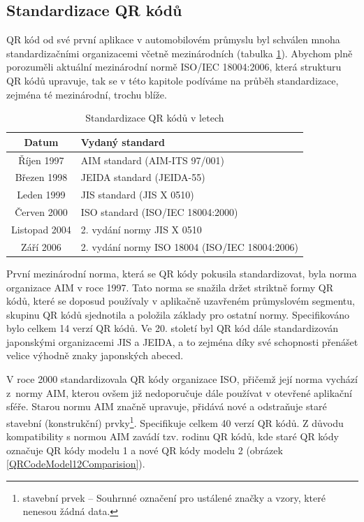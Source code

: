 \subsection{Standardizace QR kódů}
\label{standardizaceQRKodu}

QR kód od své první aplikace v automobilovém průmyslu byl schválen mnoha
standardizačními organizacemi včetně mezinárodních (tabulka 
\ref{standardizaceBehemLet}). Abychom plně porozuměli aktuální mezinárodní normě
ISO/IEC 18004:2006, která strukturu QR kódů upravuje, tak se v této 
kapitole podíváme na průběh standardizace, zejména té mezinárodní, trochu blíže.

\begin{table}[H]
  \begin{center} 
    \begin{tabular}{| c | l |} \hline
    \textbf{Datum} & \textbf{Vydaný standard} \\ \hline
    Říjen 1997 & AIM standard (AIM-ITS 97/001) \\ \hline
    Březen 1998 & JEIDA standard (JEIDA-55) \\ \hline
    Leden 1999 & JIS standard (JIS X 0510)  \\ \hline
    Červen 2000 & ISO standard (ISO/IEC 18004:2000) \\ \hline
    Listopad 2004 & 2. vydání normy JIS X 0510 \\ \hline
    Září 2006 & 2. vydání normy ISO 18004 (ISO/IEC 18004:2006)  \\ \hline
    \end{tabular}
    \caption{Standardizace QR kódů v letech \cite{standardizaceDenso}}
    \label{standardizaceBehemLet}
  \end{center}
\end{table}

První mezinárodní norma, která se QR kódy pokusila standardizovat, byla norma 
organizace AIM v roce 1997. Tato norma se snažila držet striktně formy QR kódů, 
které se doposud používaly v aplikačně uzavřeném průmyslovém segmentu, skupinu 
QR kódů sjednotila a položila základy pro ostatní normy. Specifikováno bylo 
celkem 14 verzí QR kódů. Ve 20. století byl QR kód dále standardizován 
japonskými organizacemi JIS a JEIDA, a to zejména díky své schopnosti přenášet 
velice výhodně znaky japonských abeced.

V roce 2000 standardizovala QR kódy organizace ISO, přičemž její norma vychází 
z~normy AIM, kterou ovšem již nedoporučuje dále používat v otevřené 
aplikační sféře. Starou normu AIM značně upravuje, přidává nové a 
odstraňuje staré stavební (konstrukční) prvky\footnote{stavební prvek -- Souhrnné označení pro
ustálené značky a vzory, které nenesou žádná data.}.
Specifikuje celkem 40 verzí QR kódů. Z důvodu kompatibility s normou AIM 
zavádí tzv. rodinu QR kódů, kde staré QR kódy označuje QR kódy modelu 1 a nové
QR kódy modelu 2 (obrázek \ref{QRCodeModel12Comparision}).


